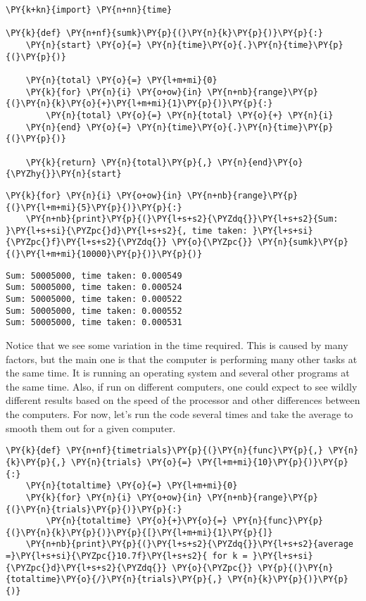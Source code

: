 \begin{Verbatim}[commandchars=\\\{\}]
\PY{k+kn}{import} \PY{n+nn}{time}

\PY{k}{def} \PY{n+nf}{sumk}\PY{p}{(}\PY{n}{k}\PY{p}{)}\PY{p}{:}
    \PY{n}{start} \PY{o}{=} \PY{n}{time}\PY{o}{.}\PY{n}{time}\PY{p}{(}\PY{p}{)}

    \PY{n}{total} \PY{o}{=} \PY{l+m+mi}{0}
    \PY{k}{for} \PY{n}{i} \PY{o+ow}{in} \PY{n+nb}{range}\PY{p}{(}\PY{n}{k}\PY{o}{+}\PY{l+m+mi}{1}\PY{p}{)}\PY{p}{:}
        \PY{n}{total} \PY{o}{=} \PY{n}{total} \PY{o}{+} \PY{n}{i}
    \PY{n}{end} \PY{o}{=} \PY{n}{time}\PY{o}{.}\PY{n}{time}\PY{p}{(}\PY{p}{)}

    \PY{k}{return} \PY{n}{total}\PY{p}{,} \PY{n}{end}\PY{o}{\PYZhy{}}\PY{n}{start}
\end{Verbatim}



\begin{Verbatim}[commandchars=\\\{\}]
\PY{k}{for} \PY{n}{i} \PY{o+ow}{in} \PY{n+nb}{range}\PY{p}{(}\PY{l+m+mi}{5}\PY{p}{)}\PY{p}{:}
    \PY{n+nb}{print}\PY{p}{(}\PY{l+s+s2}{\PYZdq{}}\PY{l+s+s2}{Sum: }\PY{l+s+si}{\PYZpc{}d}\PY{l+s+s2}{, time taken: }\PY{l+s+si}{\PYZpc{}f}\PY{l+s+s2}{\PYZdq{}} \PY{o}{\PYZpc{}} \PY{n}{sumk}\PY{p}{(}\PY{l+m+mi}{10000}\PY{p}{)}\PY{p}{)}
\end{Verbatim}

\begin{Verbatim}
Sum: 50005000, time taken: 0.000549
Sum: 50005000, time taken: 0.000524
Sum: 50005000, time taken: 0.000522
Sum: 50005000, time taken: 0.000552
Sum: 50005000, time taken: 0.000531
\end{Verbatim}


Notice that we see some variation in the time required.
This is caused by many factors, but the main one is that the computer is performing many other tasks at the same time.
It is running an operating system and several other programs at the same time.
Also, if run on different computers, one could expect to see wildly different results based on the speed of the processor and other differences between the computers.
For now, let's run the code several times and take the average to smooth them out for a given computer.

\begin{Verbatim}[commandchars=\\\{\}]
\PY{k}{def} \PY{n+nf}{timetrials}\PY{p}{(}\PY{n}{func}\PY{p}{,} \PY{n}{k}\PY{p}{,} \PY{n}{trials} \PY{o}{=} \PY{l+m+mi}{10}\PY{p}{)}\PY{p}{:}
    \PY{n}{totaltime} \PY{o}{=} \PY{l+m+mi}{0}
    \PY{k}{for} \PY{n}{i} \PY{o+ow}{in} \PY{n+nb}{range}\PY{p}{(}\PY{n}{trials}\PY{p}{)}\PY{p}{:}
        \PY{n}{totaltime} \PY{o}{+}\PY{o}{=} \PY{n}{func}\PY{p}{(}\PY{n}{k}\PY{p}{)}\PY{p}{[}\PY{l+m+mi}{1}\PY{p}{]}
    \PY{n+nb}{print}\PY{p}{(}\PY{l+s+s2}{\PYZdq{}}\PY{l+s+s2}{average =}\PY{l+s+si}{\PYZpc{}10.7f}\PY{l+s+s2}{ for k = }\PY{l+s+si}{\PYZpc{}d}\PY{l+s+s2}{\PYZdq{}} \PY{o}{\PYZpc{}} \PY{p}{(}\PY{n}{totaltime}\PY{o}{/}\PY{n}{trials}\PY{p}{,} \PY{n}{k}\PY{p}{)}\PY{p}{)}
\end{Verbatim}




